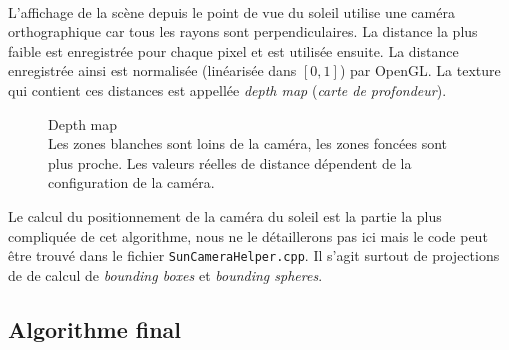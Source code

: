 \documentclass{EPUProjetDi}
\newcommand{\code}{\texttt}
\begin{document}
\paragraph{}
L'affichage de la scène depuis le point de vue du soleil utilise une caméra orthographique car tous les rayons sont perpendiculaires. La distance la plus faible est enregistrée pour chaque pixel et est utilisée ensuite. La distance enregistrée ainsi est normalisée (linéarisée dans $[0,1]$) par OpenGL. La texture qui contient ces distances est appellée \textit{depth map} (\textit{carte de profondeur}).

\begin{figure}
	\centering
	\caption[Depth map]{Depth map\\Les zones blanches sont loins de la caméra, les zones foncées sont plus proche. Les valeurs réelles de distance dépendent de la configuration de la caméra.}
	\label{fig:sun_depth_map}
	\vspace{-10pt}
\end{figure}

Le calcul du positionnement de la caméra du soleil est la partie la plus compliquée de cet algorithme, nous ne le détaillerons pas ici mais le code peut être trouvé dans le fichier \code{SunCameraHelper.cpp}. Il s'agit surtout de projections de de calcul de \textit{bounding boxes} et \textit{bounding spheres}.

\subsection{Algorithme final}
\end{document}
